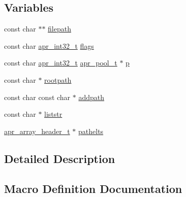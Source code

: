 \subsection*{Variables}
\begin{DoxyCompactItemize}
\item 
const char $\ast$$\ast$ \hyperlink{group__apr__filepath_gaac0088be2a5024a10d30c9686700b347}{filepath}
\item 
const char \hyperlink{group__apr__platform_ga21ef1e35fd3ff9be386f3cb20164ff02}{apr\+\_\+int32\+\_\+t} \hyperlink{group__apr__filepath_ga03afebf38bd9e70268b56aad7e124e45}{flags}
\item 
const char \hyperlink{group__apr__platform_ga21ef1e35fd3ff9be386f3cb20164ff02}{apr\+\_\+int32\+\_\+t} \hyperlink{structapr__pool__t}{apr\+\_\+pool\+\_\+t} $\ast$ \hyperlink{group__apr__filepath_ga2e727f881424334cf12d8af10f50ec6c}{p}
\item 
const char $\ast$ \hyperlink{group__apr__filepath_ga5e93c5b47952eec88fe4251b4f1a228f}{rootpath}
\item 
const char const char $\ast$ \hyperlink{group__apr__filepath_ga1a839ed2f56c94498b87e75f7d44632c}{addpath}
\item 
const char $\ast$ \hyperlink{group__apr__filepath_ga7861f6a164f5fd1cdf1d8e9b8def2be9}{liststr}
\item 
\hyperlink{structapr__array__header__t}{apr\+\_\+array\+\_\+header\+\_\+t} $\ast$ \hyperlink{group__apr__filepath_gad1eeb94cb07aaea00d625ad784d000a1}{pathelts}
\end{DoxyCompactItemize}


\subsection{Detailed Description}


\subsection{Macro Definition Documentation}
